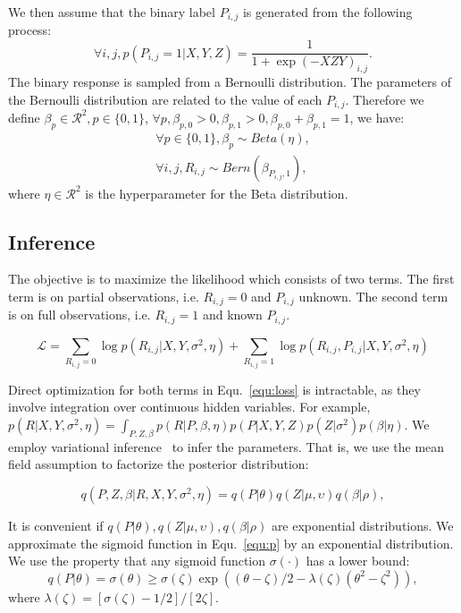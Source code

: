 \documentclass[conference]{IEEEtran}
\begin{document}
We then assume that the binary label $P_{i,j}$ is generated from the following process:
\begin{equation}\label{equ:p}
\forall i,j, p(P_{i,j}=1|X,Y,Z)=\frac{1}{1+\exp{(-XZY)}_{i,j}}.
\end{equation}
The binary response is sampled from a Bernoulli distribution. The parameters of the Bernoulli distribution are related to the value of each $P_{i,j}$. Therefore we define $\beta_p\in\mathcal{R}^{2},p\in \{0,1\}$, $\forall p, \beta_{p,0}>0,\beta_{p,1}>0,\beta_{p,0}+\beta_{p,1}=1$, we have:
\begin{eqnarray}\label{equ:q}
\forall p\in \{0,1\}, \beta_p \sim Beta(\eta),\\
\forall i,j, R_{i,j} \sim Bern (\beta_{P_{i,j},1}),
\end{eqnarray}
where $\eta\in\mathcal{R}^{2}$ is the hyperparameter for the Beta distribution.

\subsection{Inference}\label{sec:inference}
The objective is to maximize the likelihood which consists of two terms. The first term is on partial observations, i.e. $R_{i,j}=0$ and $P_{i,j}$ unknown. The second term is on full observations, i.e. $R_{i,j}=1$ and known $P_{i,j}$.

\begin{equation}\label{equ:loss}
\mathcal{L}=\sum_{R_{i,j}=0} \log p(R_{i,j}|X,Y,\sigma^2,\eta) + \sum_{R_{i,j}=1} \log p(R_{i,j},P_{i,j}|X,Y,\sigma^2,\eta)
\end{equation}


Direct optimization for both terms in Equ.~\ref{equ:loss} is intractable, as they involve integration over continuous hidden variables. For example, $p(R|X,Y,\sigma^2,\eta)=\int_{P,Z,\beta} p(R|P,\beta,\eta) p(P|X,Y,Z) p(Z|\sigma^2) p(\beta|\eta) $. We employ variational inference~\cite{Variational} to infer the parameters. That is, we use the mean field assumption to factorize the posterior distribution: 

\begin{equation}
    q(P,Z,\beta|R,X,Y,\sigma^{2},\eta) = q(P|\theta)q(Z|\mu,\upsilon)q(\beta|\rho),
\end{equation}

It is convenient if $q(P|\theta),q(Z|\mu,\upsilon),q(\beta|\rho)$ are exponential distributions. We approximate the sigmoid function in Equ.~\ref{equ:p} by an exponential distribution. We use the property that any sigmoid function $\sigma(\cdot)$ has a lower bound:
\begin{equation}
q(P|\theta)=\sigma(\theta)\geq \sigma(\zeta)\exp{((\theta-\zeta)/2-\lambda(\zeta)(\theta^2-\zeta^2))},
\end{equation}
where $\lambda(\zeta)=[\sigma(\zeta)-1/2]/[2\zeta]$.
\end{document}
